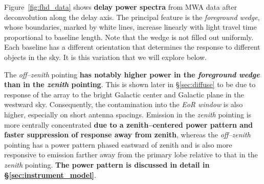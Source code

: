 \documentclass[preprint2,iop,numberedappendix]{emulateapj}
\begin{document}

Figure~\ref{fig:fhd_data} shows {\bf delay power spectra} from MWA data after deconvolution along the delay axis. The principal feature is the {\it foreground wedge}, whose boundaries, marked by white lines, increase linearly with light travel time proportional to baseline length. Note that the wedge is not filled out uniformly. Each baseline has a different orientation that determines the response to different objects in the sky. It is this variation that we will explore below. 

The {\it off--zenith} pointing {\bf has notably higher power in the {\it foreground wedge} than in the {\it zenith} pointing}. This is shown later in \S\ref{sec:diffuse} to be due to response of the array to the bright Galactic center and Galactic plane in the westward sky. Consequently, the contamination into the {\it EoR window} is also higher, especially on short antenna spacings. Emission in the {\it zenith} pointing is more centrally concentrated {\bf due to a zenith--centered power pattern and faster suppression of response away from zenith}, whereas the {\it off--zenith} pointing has a power pattern phased eastward of zenith and is also more responsive to emission farther away from the primary lobe relative to that in the {\it zenith} pointing. {\bf The power pattern is discussed in detail in \S\ref{sec:instrument_model}}.
\end{document}
